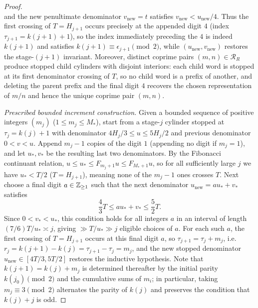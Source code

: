 \begin{proof}
\[\]
and the new penultimate denominator $v_{\mathrm{new}}=t$ satisfies
$v_{\mathrm{new}}<u_{\mathrm{new}}/4$. Thus the first crossing of $T=H_{j+1}$
occurs precisely at the appended digit $4$ (index $\tau_{j+1}=k(j+1)+1$), so the
index immediately preceding the $4$ is indeed $k(j+1)$ and satisfies
$k(j+1)\equiv\epsilon_{j+1}\pmod2$, while $(u_{\mathrm{new}},v_{\mathrm{new}})$
restores the stage-$(j+1)$ invariant. Moreover, distinct coprime pairs
$(m,n)\in\mathcal R_R$ produce stopped child cylinders with disjoint interiors:
each child word is stopped at its first denominator crossing of $T$, so no child
word is a prefix of another, and deleting the parent prefix and the final digit
$4$ recovers the chosen representation of $m/n$ and hence the unique coprime
pair $(m,n)$.

\emph{Prescribed bounded increment construction.} Given a bounded sequence of
positive integers $(m_j)$ ($1\le m_j\le M_*$), start from a stage-$j$ cylinder
stopped at $\tau_j=k(j)+1$ with denominator $4H_j/3\le u\le5H_j/2$ and previous
denominator $0<v<u$. Append $m_j-1$ copies of the digit $1$ (appending no digit
if $m_j=1$), and let $u_*,v_*$ be the resulting last two denominators. By the
Fibonacci continuant relation, $u\le u_*\le F_{m_j+1}u\le F_{M_*+1}u$, so for all
sufficiently large $j$ we have $u_*<T/2$ ($T=H_{j+1}$), meaning none of the
$m_j-1$ ones crosses $T$. Next choose a final digit $a\in\mathbb{Z}_{\ge1}$ such that
the next denominator $u_{\mathrm{new}}=au_*+v_*$ satisfies
\[
\frac43 T\le au_*+v_*\le\frac52 T.
\]
Since $0<v_*<u_*$, this condition holds for all integers $a$ in an interval of
length $(7/6)T/u_*\asymp j$, giving $\gg T/u_*\gg j$ eligible choices of $a$.
For each such $a$, the first crossing of $T=H_{j+1}$ occurs at this final digit
$a$, so $\tau_{j+1}=\tau_j+m_j$, i.e.\ $r_j=k(j+1)-k(j)=\tau_{j+1}-\tau_j=m_j$,
and the new stopped denominator $u_{\mathrm{new}}\in[4T/3,5T/2]$ restores the
inductive hypothesis. Note that $k(j+1)=k(j)+m_j$ is determined thereafter by
the initial parity $k(j_0)\pmod2$ and the cumulative sums of $m_i$; in
particular, taking $m_j\equiv3\pmod2$ alternates the parity of $k(j)$ and
preserves the condition that $k(j)+j$ is odd.


\end{proof}
